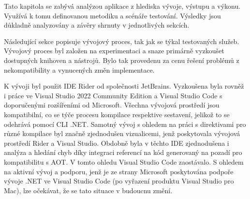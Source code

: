 
Tato kapitola se zabývá analýzou aplikace z hlediska vývoje, výstupu a výkonu. Využívá k tomu definovanou metodiku a scénáře testování. Výsledky jsou důkladně analyzovány a závěry shrnuty v jednotlivých sekcích.


Následující sekce popisuje vývojový proces, tak jak se týkal testovaných služeb. Vývojový proces byl založen na experimentaci a snaze primárně vyzkoušet dostupných knihoven a nástrojů. Bylo tak provedenu za cenu řešení problémů z nekompatibility a vynucených změn implementace.



K vývoji byl použit IDE Rider od společnosti JetBrains. Vyzkoušena byla rovněž i práce ve Visual Studio 2022 Community Edition a Visual Studio Code s doporučenými rozšířeními od Microsoft. Všechna vývojová prostředí jsou kompatibilní, co se týče procesu kompilace respektive sestavení, jelikož to se odehrává pomocí CLI .NET. Samotný vývoj s ohledem na práci s direktivami pro různé kompilace byl značně zjednodušen vizualicemi, jenž poskytovala vývojová prostředí Rider a Visual Studio. Obdobně byla v těchto IDE zjednodušena i analýza a hledání chyb díky integraci referencí na kód generovaný na pozadí pro kompatibilitu s AOT. V tomto ohledu Visual Studio Code zaostávalo. S ohledem na aktivní vývoj a podporu, jenž je ze strany Microsoft poskytována podpoře vývoje .NET ve Visual Studio Code (po vyřazení produktu Visual Studio pro Mac), lze očekávat, že se tato situace v budoucnu změní.



